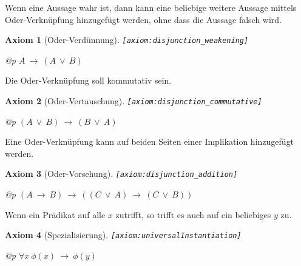 \documentclass[a4paper,german,10pt,twoside]{book}
\newtheorem{ax}{Axiom}
\theoremstyle{definition}
\theoremstyle{remark}
\begin{document}
\par
Wenn eine Aussage wahr ist, dann kann eine beliebige weitere Aussage mittels Oder-Verkn{\"u}pfung hinzugef{\"u}gt werden, ohne dass die Aussage falsch wird.

\begin{ax}[Oder-Verd{\"u}nnung]
\label{axiom:disjunction_weakening} \hypertarget{axiom:disjunction_weakening}{}
{\tt \tiny [\verb]axiom:disjunction_weakening]]}
\mbox{}
\begin{longtable}{{@{\extracolsep{\fill}}p{\linewidth}}}
\centering $A\ \rightarrow\ (A\ \lor\ B)$
\end{longtable}

\end{ax}


\par
Die Oder-Verkn{\"u}pfung soll kommutativ sein.

\begin{ax}[Oder-Vertauschung]
\label{axiom:disjunction_commutative} \hypertarget{axiom:disjunction_commutative}{}
{\tt \tiny [\verb]axiom:disjunction_commutative]]}
\mbox{}
\begin{longtable}{{@{\extracolsep{\fill}}p{\linewidth}}}
\centering $(A\ \lor\ B)\ \rightarrow\ (B\ \lor\ A)$
\end{longtable}

\end{ax}


\par
Eine Oder-Verkn{\"u}pfung kann auf beiden Seiten einer Implikation hinzugef{\"u}gt werden.

\begin{ax}[Oder-Vorsehung]
\label{axiom:disjunction_addition} \hypertarget{axiom:disjunction_addition}{}
{\tt \tiny [\verb]axiom:disjunction_addition]]}
\mbox{}
\begin{longtable}{{@{\extracolsep{\fill}}p{\linewidth}}}
\centering $(A\ \rightarrow\ B)\ \rightarrow\ ((C\ \lor\ A)\ \rightarrow\ (C\ \lor\ B))$
\end{longtable}

\end{ax}


\par
Wenn ein Pr{\"a}dikat auf alle $x$ zutrifft, so trifft es auch auf ein beliebiges $y$ zu.

\begin{ax}[Spezialisierung]
\label{axiom:universalInstantiation} \hypertarget{axiom:universalInstantiation}{}
{\tt \tiny [\verb]axiom:universalInstantiation]]}
\mbox{}
\begin{longtable}{{@{\extracolsep{\fill}}p{\linewidth}}}
\centering $\forall x\ \phi(x)\ \rightarrow\ \phi(y)$
\end{longtable}

\end{ax}
\end{document}
